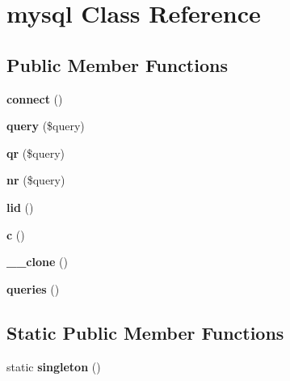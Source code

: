 \hypertarget{classmysql}{
\section{\-m\-y\-s\-q\-l \-C\-l\-a\-s\-s \-R\-e\-f\-e\-r\-e\-n\-c\-e}
\label{classmysql}
}
\subsection*{Public Member Functions}
\begin{DoxyCompactItemize}
\item 
\hypertarget{classmysql_aa0980d07b111499ce63b266457829834}{
{\bfseries \-c\-o\-n\-n\-e\-c\-t} \-(\-)}
\label{classmysql_aa0980d07b111499ce63b266457829834}

\item 
\hypertarget{classmysql_ac4cac3056ae303c7acbe3c0c037639e4}{
{\bfseries \-q\-u\-e\-r\-y} \-(\$\-q\-u\-e\-r\-y\-)}
\label{classmysql_ac4cac3056ae303c7acbe3c0c037639e4}

\item 
\hypertarget{classmysql_aa7bd8a34fcf419a78b14db3b68b4993b}{
{\bfseries \-q\-r} \-(\$\-q\-u\-e\-r\-y\-)}
\label{classmysql_aa7bd8a34fcf419a78b14db3b68b4993b}

\item 
\hypertarget{classmysql_a7f24920bf0cb7d72fe6b7d180f79fe6b}{
{\bfseries \-n\-r} \-(\$\-q\-u\-e\-r\-y\-)}
\label{classmysql_a7f24920bf0cb7d72fe6b7d180f79fe6b}

\item 
\hypertarget{classmysql_a78a2cc793693fa48e5614de0c3cbf861}{
{\bfseries \-l\-i\-d} \-(\-)}
\label{classmysql_a78a2cc793693fa48e5614de0c3cbf861}

\item 
\hypertarget{classmysql_a7dea87238dafd32f35badfc689032548}{
{\bfseries \-c} \-(\-)}
\label{classmysql_a7dea87238dafd32f35badfc689032548}

\item 
\hypertarget{classmysql_a453cc9231b722ff2e0a6bfe1fb5c189e}{
{\bfseries \_\-\_\-\-c\-l\-o\-n\-e} \-(\-)}
\label{classmysql_a453cc9231b722ff2e0a6bfe1fb5c189e}

\item 
\hypertarget{classmysql_a96b220df11f4f115bc682fc100b88685}{
{\bfseries \-q\-u\-e\-r\-i\-e\-s} \-(\-)}
\label{classmysql_a96b220df11f4f115bc682fc100b88685}

\end{DoxyCompactItemize}
\subsection*{Static Public Member Functions}
\begin{DoxyCompactItemize}
\item 
\hypertarget{classmysql_a2b3780eec0ad7c4be1728cbc02dc13c9}{
\-s\-t\-a\-t\-i\-c {\bfseries \-s\-i\-n\-g\-l\-e\-t\-o\-n} \-(\-)}
\label{classmysql_a2b3780eec0ad7c4be1728cbc02dc13c9}

\end{DoxyCompactItemize}
